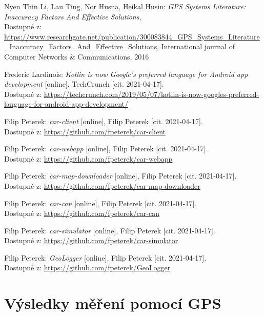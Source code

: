 \documentclass[czech, bachelor]{diploma}
\begin{document}
\begin{thebibliography}{20}
Nyen Thin Li, Lau Ting, Nor Husna, Heikal Husin: \textit{GPS Systems Literature: Inaccuracy Factors And Effective Solutions}, \\
Dostupné z:
\url{https://www.researchgate.net/publication/300083844\_GPS\_Systems\_Literature\_Inaccuracy\_Factors\_And\_Effective\_Solutions},
International journal of Computer Networks \& Communications, 2016

Frederic Lardinois: \textit{Kotlin is now Google's preferred language for Android app development} [online],
TechCrunch [cit. 2021-04-17]. \\
Dostupné z:
\url{https://techcrunch.com/2019/05/07/kotlin-is-now-googles-preferred-language-for-android-app-development/}

Filip Peterek: \textit{car-client} [online], Filip Peterek [cit. 2021-04-17]. \\
Dostupné z:
\url{https://github.com/fpeterek/car-client}

Filip Peterek: \textit{car-webapp} [online], Filip Peterek [cit. 2021-04-17]. \\
Dostupné z:
\url{https://github.com/fpeterek/car-webapp}

Filip Peterek: \textit{car-map-downloader} [online], Filip Peterek [cit. 2021-04-17]. \\
Dostupné z:
\url{https://github.com/fpeterek/car-map-downloader}

Filip Peterek: \textit{car-can} [online], Filip Peterek [cit. 2021-04-17]. \\
Dostupné z:
\url{https://github.com/fpeterek/car-can}

Filip Peterek: \textit{car-simulator} [online], Filip Peterek [cit. 2021-04-17]. \\
Dostupné z:
\url{https://github.com/fpeterek/car-simulator}

Filip Peterek: \textit{GeoLogger} [online], Filip Peterek [cit. 2021-04-17]. \\
Dostupné z:
\url{https://github.com/fpeterek/GeoLogger}

\end{thebibliography}

\appendix

\chapter{Výsledky měření pomocí GPS} \label{gps-measuring-results-all}
\end{document}

